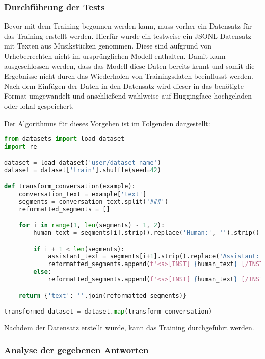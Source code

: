 \documentclass[german,report]{i1thesis}
\begin{document}
\subsubsection{Durchführung der Tests}%
\label{subsec:durchfuehrung-der-tests}

Bevor mit dem Training begonnen werden kann, muss vorher ein Datensatz für das Training erstellt werden.
Hierfür wurde ein testweise ein \ac{JSONL}-Datensatz mit Texten aus Musikstücken genommen.
Diese sind aufgrund von Urheberrechten nicht im ursprünglichen Modell enthalten.
Damit kann ausgeschlossen werden, dass das Modell diese Daten bereits kennt und somit die Ergebnisse nicht durch das Wiederholen von Trainingsdaten beeinflusst werden.
Nach dem Einfügen der Daten in den Datensatz wird dieser in das benötigte Format umgewandelt und anschließend wahlweise auf Huggingface hochgeladen oder lokal gespeichert.

Der Algorithmus für dieses Vorgehen ist im Folgenden dargestellt:

\begin{lstlisting}[language=Python]
from datasets import load_dataset
import re

dataset = load_dataset('user/dataset_name')
dataset = dataset['train'].shuffle(seed=42)

def transform_conversation(example):
    conversation_text = example['text']
    segments = conversation_text.split('###')
    reformatted_segments = []

    for i in range(1, len(segments) - 1, 2):
        human_text = segments[i].strip().replace('Human:', '').strip()

        if i + 1 < len(segments):
            assistant_text = segments[i+1].strip().replace('Assistant:', '').strip()
            reformatted_segments.append(f'<s>[INST] {human_text} [/INST] {assistant_text} </s>')
        else:
            reformatted_segments.append(f'<s>[INST] {human_text} [/INST] </s>')

    return {'text': ''.join(reformatted_segments)}

transformed_dataset = dataset.map(transform_conversation)
\end{lstlisting}

Nachdem der Datensatz erstellt wurde, kann das Training durchgeführt werden.

\subsubsection{Analyse der gegebenen Antworten}%
\label{subsec:Analyse der gegebenen Antworten}
\end{document}
